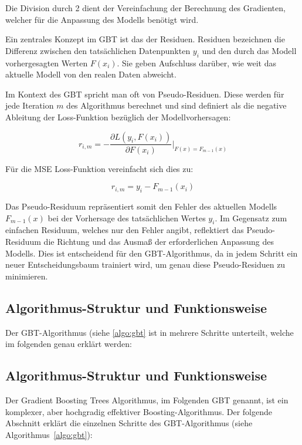 Die Division durch 2 dient der Vereinfachung der Berechnung des Gradienten, welcher für die Anpassung des Modells benötigt wird.

Ein zentrales Konzept im GBT ist das der Residuen. Residuen bezeichnen die Differenz zwischen den tatsächlichen Datenpunkten \( y_i \) und den durch das Modell vorhergesagten Werten \( F(x_i) \). Sie geben Aufschluss darüber, wie weit das aktuelle Modell von den realen Daten abweicht.

Im Kontext des GBT spricht man oft von Pseudo-Residuen. Diese werden für jede Iteration \( m \) des Algorithmus berechnet und sind definiert als die negative Ableitung der Loss-Funktion bezüglich der Modellvorhersagen:

\begin{equation}
    r_{i,m} = -\frac{\partial L(y_i, F(x_i))}{\partial F(x_i)}\bigg|_{F(x)=F_{m-1}(x)}
\end{equation}

Für die MSE Loss-Funktion vereinfacht sich dies zu:

\begin{equation}
    r_{i,m} = y_i - F_{m-1}(x_i)
\end{equation}

Das Pseudo-Residuum repräsentiert somit den Fehler des aktuellen Modells \( F_{m-1}(x) \) bei der Vorhersage des tatsächlichen Wertes \( y_i \). Im Gegensatz zum einfachen Residuum, welches nur den Fehler angibt, reflektiert das Pseudo-Residuum die Richtung und das Ausmaß der erforderlichen Anpassung des Modells. Dies ist entscheidend für den GBT-Algorithmus, da in jedem Schritt ein neuer Entscheidungsbaum trainiert wird, um genau diese Pseudo-Residuen zu minimieren.


















\subsection{Algorithmus-Struktur und Funktionsweise}
Der GBT-Algorithmus (siehe \autoref{algo:gbt} ist in mehrere Schritte unterteilt, welche im folgenden genau erklärt werden:


\subsection{Algorithmus-Struktur und Funktionsweise}
Der Gradient Boosting Trees Algorithmus, im Folgenden GBT genannt, ist ein komplexer, aber hochgradig effektiver Boosting-Algorithmus. Der folgende Abschnitt erklärt die einzelnen Schritte des GBT-Algorithmus (siehe Algorithmus~\ref{algo:gbt}):

